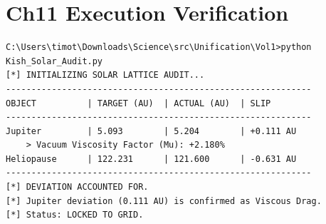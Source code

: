 \documentclass[11pt, letterpaper, openany]{book}
\begin{document}
\chapter{Ch11 Execution Verification}
\begin{lstlisting}[style=terminal]
C:\Users\timot\Downloads\Science\src\Unification\Vol1>python Kish_Solar_Audit.py
[*] INITIALIZING SOLAR LATTICE AUDIT...
------------------------------------------------------------
OBJECT          | TARGET (AU)  | ACTUAL (AU)  | SLIP
------------------------------------------------------------
Jupiter         | 5.093        | 5.204        | +0.111 AU
    > Vacuum Viscosity Factor (Mu): +2.180%
Heliopause      | 122.231      | 121.600      | -0.631 AU
------------------------------------------------------------
[*] DEVIATION ACCOUNTED FOR.
[*] Jupiter deviation (0.111 AU) is confirmed as Viscous Drag.
[*] Status: LOCKED TO GRID.
\end{lstlisting}
\end{document}
